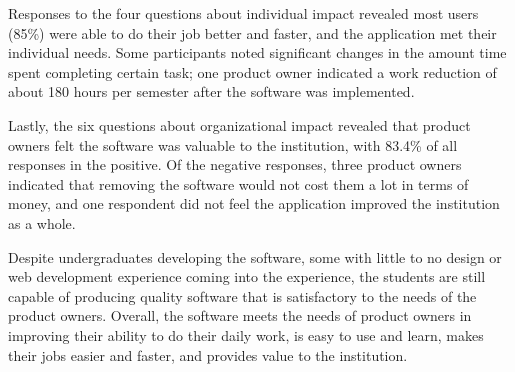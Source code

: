 Responses to the four questions about individual impact revealed most users (85\%) were able to do their job better and faster, and the application met their individual needs. Some participants noted significant changes in the amount time spent completing certain task; one product owner indicated a work reduction of about 180 hours per semester after the software was implemented.


Lastly, the six questions about organizational impact revealed that product owners felt the software was valuable to the institution, with 83.4\% of all responses in the positive. Of the negative responses, three product owners indicated that removing the software would not cost them a lot in terms of money, and one respondent did not feel the application improved the institution as a whole. 

Despite undergraduates developing the software, some with little to no design or web development experience coming into the experience, the students are still capable of producing quality software that is satisfactory to the needs of the product owners. Overall, the software meets the needs of product owners in improving their ability to do their daily work, is easy to use and learn, makes their jobs easier and faster, and provides value to the institution. 



